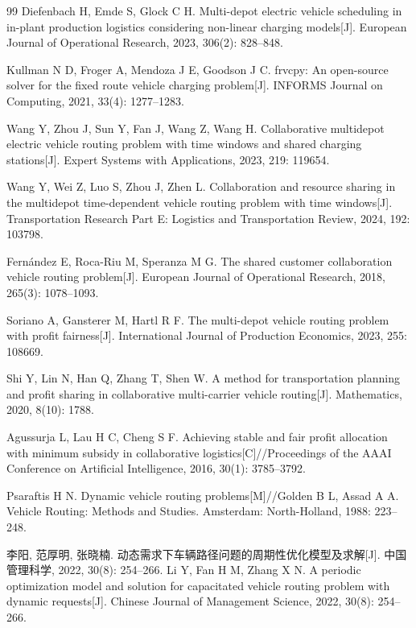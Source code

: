 \documentclass{setp-new}
\begin{document}
\begin{thebibliography}{99}
 Diefenbach H, Emde S, Glock C H. Multi-depot electric vehicle scheduling in in-plant production logistics considering non-linear charging models[J]. European Journal of Operational Research, 2023, 306(2): 828--848.

 Kullman N D, Froger A, Mendoza J E, Goodson J C. frvcpy: An open-source solver for the fixed route vehicle charging problem[J]. INFORMS Journal on Computing, 2021, 33(4): 1277--1283.

 Wang Y, Zhou J, Sun Y, Fan J, Wang Z, Wang H. Collaborative multidepot electric vehicle routing problem with time windows and shared charging stations[J]. Expert Systems with Applications, 2023, 219: 119654.

 Wang Y, Wei Z, Luo S, Zhou J, Zhen L. Collaboration and resource sharing in the multidepot time-dependent vehicle routing problem with time windows[J]. Transportation Research Part E: Logistics and Transportation Review, 2024, 192: 103798.

 Fern\'{a}ndez E, Roca-Riu M, Speranza M G. The shared customer collaboration vehicle routing problem[J]. European Journal of Operational Research, 2018, 265(3): 1078--1093.

 Soriano A, Gansterer M, Hartl R F. The multi-depot vehicle routing problem with profit fairness[J]. International Journal of Production Economics, 2023, 255: 108669.

 Shi Y, Lin N, Han Q, Zhang T, Shen W. A method for transportation planning and profit sharing in collaborative multi-carrier vehicle routing[J]. Mathematics, 2020, 8(10): 1788.

 Agussurja L, Lau H C, Cheng S F. Achieving stable and fair profit allocation with minimum subsidy in collaborative logistics[C]//Proceedings of the AAAI Conference on Artificial Intelligence, 2016, 30(1): 3785--3792.

 Psaraftis H N. Dynamic vehicle routing problems[M]//Golden B L, Assad A A. Vehicle Routing: Methods and Studies. Amsterdam: North-Holland, 1988: 223--248.

 李阳, 范厚明, 张晓楠. 动态需求下车辆路径问题的周期性优化模型及求解[J]. 中国管理科学, 2022, 30(8): 254--266.\newline
Li Y, Fan H M, Zhang X N. A periodic optimization model and solution for capacitated vehicle routing problem with dynamic requests[J]. Chinese Journal of Management Science, 2022, 30(8): 254--266.


\end{thebibliography}
\end{document}

